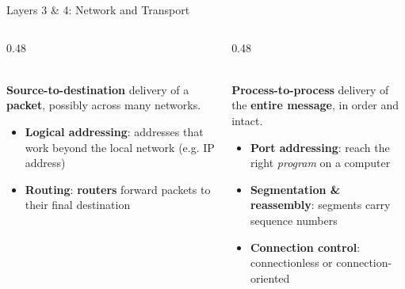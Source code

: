 \documentclass[aspectratio=169,11pt,xcolor={table}]{beamer}
\begin{document}
\begin{frame}{Layers 3 \& 4: Network and Transport}
  \begin{columns}[T]
    \begin{column}{0.48\textwidth}
      \\[1mm]
      {\small \textbf{Source-to-destination} delivery of a \textbf{packet}, possibly across many networks.}
      \begin{itemize}\scriptsize\setlength{\itemsep}{2pt}
        \item \textbf{Logical addressing}: addresses that work beyond the local network (e.g. IP address)
        \item \textbf{Routing}: \textbf{routers} forward packets to their final destination
      \end{itemize}
      \centering
    \end{column}
    \begin{column}{0.48\textwidth}
      \\[1mm]
      {\small \textbf{Process-to-process} delivery of the \textbf{entire message}, in order and intact.}
      \begin{itemize}\scriptsize\setlength{\itemsep}{2pt}
        \item \textbf{Port addressing}: reach the right \emph{program} on a computer
        \item \textbf{Segmentation \& reassembly}: segments carry sequence numbers
        \item \textbf{Connection control}: connectionless or connection-oriented

\end{itemize}
\end{column}
\end{columns}
\end{frame}
\end{document}
